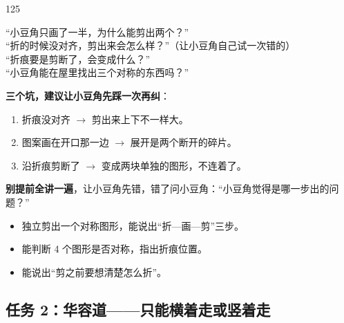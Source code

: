 \begin{lesson}{1}{25}
\begin{saybox}
“小豆角只画了一半，为什么能剪出两个？”\\
“折的时候没对齐，剪出来会怎么样？”（让小豆角自己试一次错的）\\
“折痕要是剪断了，会变成什么？”\\
“小豆角能在屋里找出三个对称的东西吗？”
\end{saybox}

\begin{pitbox}
\textbf{三个坑，建议让小豆角先踩一次再纠}：
\begin{enumerate}[label=\arabic*、]
  \item 折痕没对齐 $\to$ 剪出来上下不一样大。
  \item 图案画在开口那一边 $\to$ 展开是两个断开的碎片。
  \item 沿折痕剪断了 $\to$ 变成两块单独的图形，不连着了。
\end{enumerate}
\textbf{别提前全讲一遍}，让小豆角先错，错了问小豆角：“小豆角觉得是哪一步出的问题？”
\end{pitbox}

\begin{passbox}
\begin{itemize}
  \item 独立剪出一个对称图形，能说出“折—画—剪”三步。
  \item 能判断 4 个图形是否对称，指出折痕位置。
  \item 能说出“剪之前要想清楚怎么折”。
\end{itemize}
\end{passbox}
\end{lesson}

\subsection{任务 2：华容道——只能横着走或竖着走}

